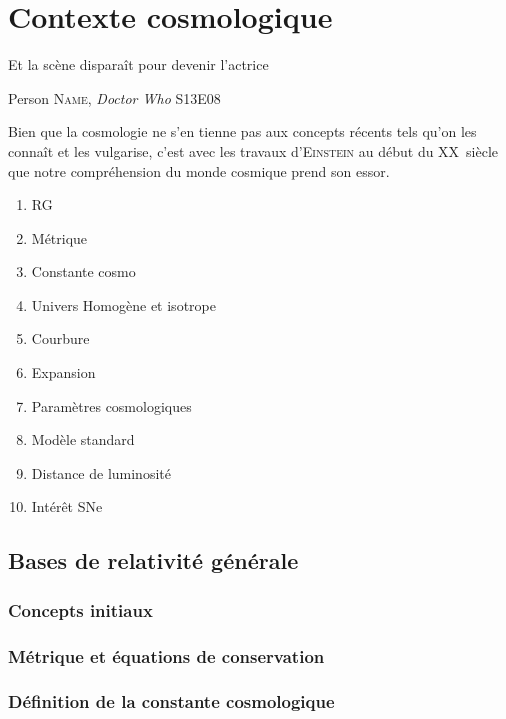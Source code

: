 \documentclass[../main/main.tex]{subfiles}
\begin{document}
\chapter{Contexte cosmologique}\label{cp:cosmo}

\epigraph{Et la scène disparaît pour devenir l'actrice}{Person \textsc{Name},
\textit{Doctor Who} S13E08}

\noindent Bien que la cosmologie ne s'en tienne pas aux concepts récents tels
qu'on les connaît et les vulgarise, c'est avec les travaux d'\textsc{Einstein}
au début du XX\ieme~siècle que notre compréhension du monde cosmique prend son
essor. 

\minitoc

\begin{enumerate}
    \item RG
    \item Métrique
    \item Constante cosmo
    \item Univers Homogène et isotrope
    \item Courbure
    \item Expansion
    \item Paramètres cosmologiques
    \item Modèle standard
    \item Distance de luminosité
    \item Intérêt SNe
\end{enumerate}
\newpage

\section{Bases de relativité générale}\label{sec:11}

\subsection{Concepts initiaux}\label{ssec:RG}

\subsection{Métrique et équations de conservation}\label{ssec:112}

\subsection{Définition de la constante cosmologique}\label{ssec:lambda}
\end{document}
